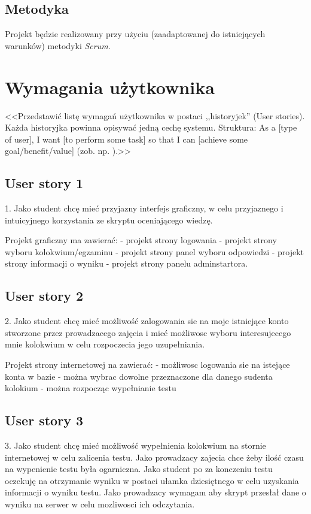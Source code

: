 \documentclass[a4paper]{article}
\begin{document}
\subsection{Metodyka}

Projekt będzie realizowany przy użyciu (zaadaptowanej do istniejących warunków) metodyki {\em Scrum}. 

\section{Wymagania użytkownika}
						<<Przedstawić listę wymagań użytkownika w postaci ,,historyjek'' (User stories). Każda historyjka powinna opisywać jedną cechę systemu. Struktura: As a [type of user], I want [to perform some task] so that I can [achieve some goal/benefit/value] (zob. np. \cite{us}).>>

\subsection{User story 1}
1. 
Jako student chcę mieć przyjazny interfejs graficzny, w celu przyjaznego i intuicyjnego korzystania ze skryptu oceniającego wiedzę.

Projekt graficzny ma zawierać:
- projekt strony logowania
- projekt strony wyboru kolokwium/egzaminu
- projekt strony panel wyboru odpowiedzi
- projekt strony informacji o wyniku
- projekt strony panelu adminstartora.


\subsection{User story 2}
2.
Jako student chcę mieć możliwość zalogowania sie na moje istniejące konto stworzone przez prowadzacego zajęcia i mieć możliwosc wyboru interesujecego mnie kolokwium w celu rozpoczecia jego uzupełniania.

Projekt strony internetowej na zawierać:
- możliwosc logowania sie na istejące konta w bazie
- można wybrac dowolne przeznaczone dla danego sudenta kolokium 
- można rozpocząc wypełnianie testu


\subsection*{User story 3}
3.
Jako student chcę mieć możliwość wypełnienia kolokwium na stornie internetowej w celu zalicenia testu. Jako prowadzacy zajecia chce żeby ilość czasu na wypenienie testu była ogarniczna. Jako student po za konczeniu testu oczekuję na otrzymanie wyniku w postaci ułamka dziesiętnego w celu uzyskania informacji o wyniku testu. Jako prowadzacy wymagam aby skrypt przesłał dane o wyniku na serwer w celu mozliwosci ich odczytania.
\end{document}
